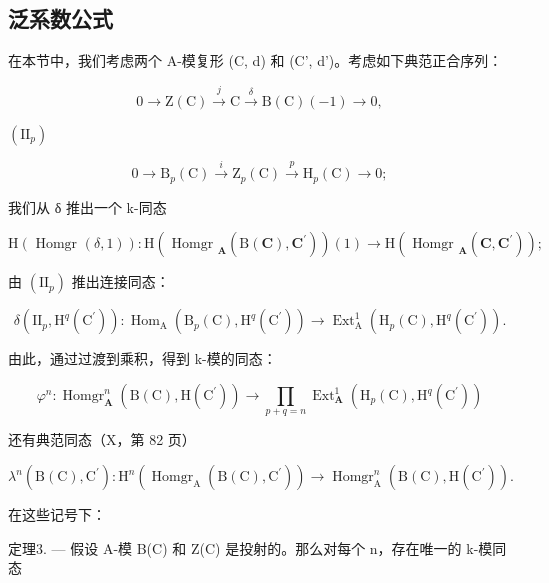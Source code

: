\subsection{泛系数公式}

在本节中，我们考虑两个 A-模复形 (C, d) 和 (C', d')。考虑如下典范正合序列：

\[
0 \rightarrow \mathrm{Z} (\mathrm{C}) \stackrel {{j}} {{\rightarrow}} \mathrm{C} \stackrel {{\delta}} {{\rightarrow}} \mathrm{B} (\mathrm{C}) (- 1) \rightarrow 0,\tag{I}
\]

\((\mathrm{II}_{p})\)

\[
0 \to \mathrm{B} _ {p} (\mathrm{C}) \stackrel {{i}} {{\to}} \mathrm{Z} _ {p} (\mathrm{C}) \stackrel {{p}} {{\to}} \mathrm{H} _ {p} (\mathrm{C}) \to 0;
\]

我们从 δ 推出一个 k-同态

\[
\mathrm{H} (\text { Homgr } (\delta , 1)): \mathrm{H} (\text { Homgr } _ {\mathbf {A}} (\mathrm{B} (\mathbf {C}), \mathbf {C} ^ {\prime})) (1) \rightarrow \mathrm{H} (\text { Homgr } _ {\mathbf {A}} (\mathbf {C}, \mathbf {C} ^ {\prime}));
\]

由 \((\mathrm{II}_{p})\) 推出连接同态：

\[
\delta \left(\mathrm{II} _ {p}, \mathrm{H} ^ {q} \left(\mathrm{C} ^ {\prime}\right)\right): \operatorname{Hom} _ {\mathrm{A}} \left(\mathrm{B} _ {p} (\mathrm{C}), \mathrm{H} ^ {q} \left(\mathrm{C} ^ {\prime}\right)\right)\rightarrow \operatorname{Ext} _ {\mathrm{A}} ^ {1} \left(\mathrm{H} _ {p} (\mathrm{C}), \mathrm{H} ^ {q} \left(\mathrm{C} ^ {\prime}\right)\right).
\]

由此，通过过渡到乘积，得到 k-模的同态：

\[
\varphi^ {n}: \operatorname{Homgr} _ {\mathbf {A}} ^ {n} (\mathrm{B} (\mathrm{C}), \mathrm{H} (\mathrm{C} ^ {\prime})) \rightarrow \prod_ {p + q = n} \operatorname{Ext} _ {\mathbf {A}} ^ {1} \left(\mathrm{H} _ {p} (\mathrm{C}), \mathrm{H} ^ {q} (\mathrm{C} ^ {\prime})\right)
\]

还有典范同态（X，第 82 页）

\[
\lambda^ {n} (\mathrm{B} (\mathrm{C}), \mathrm{C} ^ {\prime}): \mathrm{H} ^ {n} \left(\operatorname{Homgr} _ {\mathrm{A}} (\mathrm{B} (\mathrm{C}), \mathrm{C} ^ {\prime})\right)\rightarrow \operatorname{Homgr} _ {\mathrm{A}} ^ {n} (\mathrm{B} (\mathrm{C}), \mathrm{H} (\mathrm{C} ^ {\prime})) .
\]

在这些记号下：

定理3. --- 假设 A-模 B(C) 和 Z(C) 是投射的。那么对每个 n，存在唯一的 k-模同态

